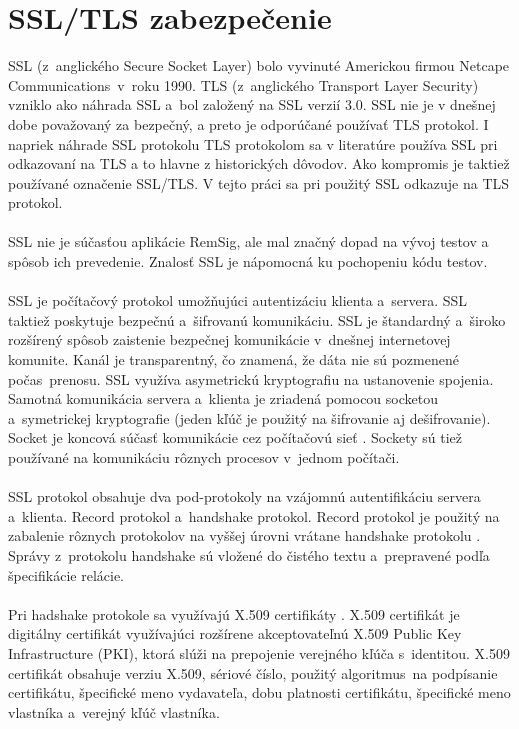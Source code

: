 \documentclass[
  digital, %
  table,   %
oneside,
  nolof,     %
  nolot,     %
]{fithesis3}
\begin{document}
\section{SSL/TLS zabezpečenie}
SSL (z~anglického Secure Socket Layer) bolo vyvinuté Americkou firmou Netcape Communications~v~roku 1990. TLS (z~anglického Transport Layer Security) vzniklo ako náhrada SSL a~bol založený na SSL verzií 3.0. SSL nie je v dnešnej dobe považovaný za bezpečný, a preto je odporúčané používať TLS protokol. I napriek náhrade SSL protokolu TLS protokolom sa v literatúre používa SSL pri odkazovaní na TLS a to hlavne z historických dôvodov. Ako kompromis je taktiež používané označenie SSL/TLS. V tejto práci sa pri použitý SSL odkazuje na TLS protokol. \paragraph{}
SSL nie je súčasťou aplikácie RemSig, ale mal značný dopad na vývoj testov a spôsob ich prevedenie. Znalosť SSL je nápomocná ku pochopeniu kódu testov.
\paragraph{}

SSL je počítačový protokol umožňujúci autentizáciu  klienta a~servera. SSL taktiež  poskytuje  bezpečnú a~šifrovanú komunikáciu.
 SSL je štandardný a~široko rozšírený spôsob zaistenie bezpečnej komunikácie v~dnešnej internetovej komunite. Kanál je transparentný, čo znamená, že dáta nie sú pozmenené počas~prenosu. SSL využíva asymetrickú kryptografiu  na ustanovenie spojenia. Samotná komunikácia servera a~klienta je zriadená pomocou socketou a~symetrickej kryptografie (jeden kľúč je použitý na šifrovanie aj dešifrovanie). Socket je koncová súčasť komunikácie cez počítačovú sieť \cite{networkSocket}. Sockety sú tiež používané na komunikáciu rôznych procesov v~jednom počítači. \paragraph{}
SSL protokol obsahuje dva pod-protokoly na vzájomnú autentifikáciu servera a~klienta. Record protokol a~handshake protokol. Record protokol je použitý na zabalenie rôznych protokolov na vyššej úrovni vrátane handshake protokolu \cite{ssl3.0}. Správy z~protokolu handshake  sú vložené do čistého textu a~prepravené podľa špecifikácie relácie. \paragraph{}
Pri hadshake protokole sa využívajú X.509 certifikáty \cite{x509cert}. X.509 certifikát je digitálny certifikát využívajúci rozšírene akceptovateľnú X.509 Public Key Infrastructure (PKI), ktorá slúži na prepojenie verejného kľúča s~identitou.  X.509 certifikát obsahuje verziu X.509, sériové číslo, použitý algoritmus~na podpísanie certifikátu, špecifické meno vydavateľa, dobu platnosti certifikátu, špecifické meno vlastníka a~verejný kľúč vlastníka.  
\end{document}
